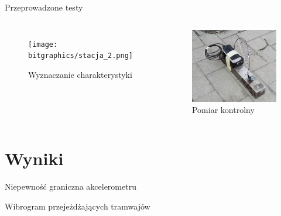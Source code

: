 \documentclass[aspectratio=1610,polish]{beamer} %
\begin{document}
  \begin{frame}{Przeprowadzone testy}
    \begin{columns}
      \begin{figure}
        \texttt{[image: bitgraphics/stacja\_2.png]}
        \caption{Wyznaczanie charakterystyki}
      \end{figure}
      \begin{figure}
        \includegraphics[width=\textwidth]{bitgraphics/stacja_1.png}
        \caption{Pomiar kontrolny}
      \end{figure}
    \end{columns}
  \end{frame}
  \section{Wyniki}
  \begin{frame}{Niepewność graniczna akcelerometru}
    \begin{figure}
      
    \end{figure}
  \end{frame}
  \begin{frame}{Wibrogram przejeżdżających tramwajów}
    \begin{figure}
      
    \end{figure}
  \end{frame}
\end{document}
